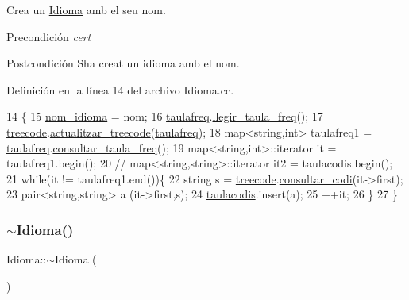 Crea un \hyperlink{class_idioma}{Idioma} amb el seu nom. 

\begin{DoxyPrecond}{Precondición}
{\itshape cert} 
\end{DoxyPrecond}
\begin{DoxyPostcond}{Postcondición}
S\textquotesingle{}ha creat un idioma amb el nom. 
\end{DoxyPostcond}


Definición en la línea 14 del archivo Idioma.\+cc.


\begin{DoxyCode}
14                            \{
15     \hyperlink{class_idioma_a4f95caa662042f1404ab10319b50ee56}{nom\_idioma} = nom;
16     \hyperlink{class_idioma_a51e5f7366342e04f3dae8a4f0fdcca60}{taulafreq}.\hyperlink{class_taula__de__freq_a6e3d7bfaa7227f9b7603864c7a3da2cf}{llegir\_taula\_freq}();
17     \hyperlink{class_idioma_ab80d7ef5fec4c922bc65e97e6e3bf968}{treecode}.\hyperlink{class_treecode_a9b9e9d2f0cce1d4293a7e28ab0ba76f7}{actualitzar\_treecode}(\hyperlink{class_idioma_a51e5f7366342e04f3dae8a4f0fdcca60}{taulafreq});
18     map<string,int> taulafreq1 = \hyperlink{class_idioma_a51e5f7366342e04f3dae8a4f0fdcca60}{taulafreq}.\hyperlink{class_taula__de__freq_a438f3ce025ca433420891fead5affae4}{consultar\_taula\_freq}();
19     map<string,int>::iterator it = taulafreq1.begin();
20 \textcolor{comment}{//     map<string,string>::iterator it2 = taulacodis.begin();}
21     \textcolor{keywordflow}{while}(it != taulafreq1.end())\{
22         \textcolor{keywordtype}{string} s = \hyperlink{class_idioma_ab80d7ef5fec4c922bc65e97e6e3bf968}{treecode}.\hyperlink{class_treecode_adee719707b72a25e70e3c108d0bd60a1}{consultar\_codi}(it->first);
23         pair<string,string> a (it->first,s);
24         \hyperlink{class_idioma_a8eb4228a5182a71efe31c110f2500723}{taulacodis}.insert(a);
25         ++it;
26     \}
27 \}
\end{DoxyCode}
\mbox{\label{class_idioma_a80c90f8c9a7f824d7d7d171b9face201}} 
\subsubsection{\texorpdfstring{$\sim$\+Idioma()}{~Idioma()}}
{\footnotesize\ttfamily Idioma\+::$\sim$\+Idioma (\begin{DoxyParamCaption}{ }\end{DoxyParamCaption})}



